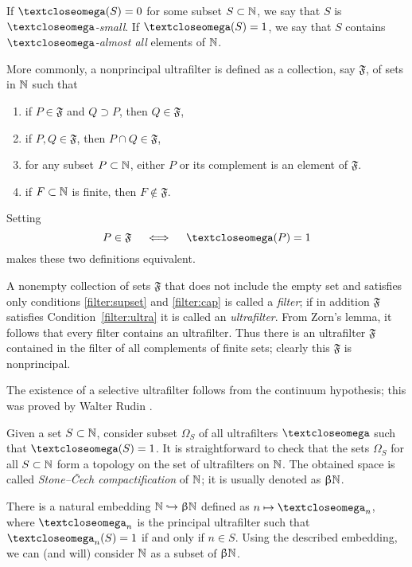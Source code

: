 If $\o(S)=0$ for some subset $S\subset \NN$,
we say that $S$ is \emph{$\o$-small}. 
If $\o(S)=1$, we say that $S$ contains \emph{$\o$-almost all} elements of $\mathbb{N}$.

More commonly, a nonprincipal ultrafilter is defined as a collection, say $\mathfrak{F}$, of sets in $\mathbb{N}$ such that
\begin{enumerate}
\item\label{filter:supset} if $P\in \mathfrak{F}$ and $Q\supset P$, then $Q\in \mathfrak{F}$,
\item\label{filter:cap} if $P, Q\in \mathfrak{F}$, then $P\cap Q\in \mathfrak{F}$,
\item\label{filter:ultra} for any subset $P\subset\NN$, either $P$ or its complement is an element of $\mathfrak{F}$.
\item\label{filter:non-prin} if $F\subset \NN $ is finite, then $F\notin \mathfrak{F}$.
\end{enumerate}
Setting 
\[P\in\mathfrak{F}\quad\iff\quad\o(P)=1\] 
makes these two definitions equivalent.

A nonempty collection of sets $\mathfrak{F}$ that does not include the empty set and satisfies only conditions \ref{filter:supset} and \ref{filter:cap} is called a \emph{filter}; 
if in addition $\mathfrak{F}$ satisfies Condition~\ref{filter:ultra} it is called an \emph{ultrafilter}.
From Zorn's lemma, it follows that every filter contains an ultrafilter.
Thus there is an ultrafilter $\mathfrak{F}$ contained in the filter of all complements of finite sets; clearly this $\mathfrak{F}$ is nonprincipal.

The existence of a selective ultrafilter follows from the continuum hypothesis;
this was proved by Walter Rudin \cite{rudin}.

Given a set $S\subset \NN$, consider subset $\Omega_S$ of all ultrafilters $\o$ such that $\o(S)=1$.
It is straightforward to check that the sets $\Omega_S$ for all $S\subset \NN$ form a topology on the set of ultrafilters on $\mathbb{N}$. 
The obtained space is called \emph{Stone--\v{C}ech compactification} of $\mathbb{N}$;
it is usually denoted as $\upbeta\mathbb{N}$.

There is a natural embedding $\NN\hookrightarrow\beta\NN$ defined as
$n\mapsto\o_n$, where $\o_n$ is the principal ultrafilter such that $\o_n(S)=1$ if and only if $n\in S$. 
Using the described embedding, we can (and will) consider $\mathbb{N}$ as a subset of $\upbeta\mathbb{N}$.


